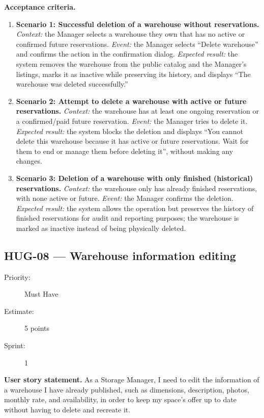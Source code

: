\documentclass[11pt,a4paper,oneside]{report}
\begin{document}
\textbf{Acceptance criteria.}
\begin{enumerate}
\item \textbf{Scenario 1: Successful deletion of a warehouse without reservations.} \emph{Context:} the Manager selects a warehouse they own that has no active or confirmed future reservations. \emph{Event:} the Manager selects ``Delete warehouse'' and confirms the action in the confirmation dialog. \emph{Expected result:} the system removes the warehouse from the public catalog and the Manager's listings, marks it as inactive while preserving its history, and displays ``The warehouse was deleted successfully.''
\item \textbf{Scenario 2: Attempt to delete a warehouse with active or future reservations.} \emph{Context:} the warehouse has at least one ongoing reservation or a confirmed/paid future reservation. \emph{Event:} the Manager tries to delete it. \emph{Expected result:} the system blocks the deletion and displays ``You cannot delete this warehouse because it has active or future reservations. Wait for them to end or manage them before deleting it'', without making any changes.
\item \textbf{Scenario 3: Deletion of a warehouse with only finished (historical) reservations.} \emph{Context:} the warehouse only has already finished reservations, with none active or future. \emph{Event:} the Manager confirms the deletion. \emph{Expected result:} the system allows the operation but preserves the history of finished reservations for audit and reporting purposes; the warehouse is marked as inactive instead of being physically deleted.
\end{enumerate}

\subsection{HUG-08 --- Warehouse information editing}
\label{req:HUG-08}
\begin{description}
\item[Priority:] Must Have \quad \item[Estimate:] 5 points \quad \item[Sprint:] 1
\end{description}

\textbf{User story statement.} As a Storage Manager, I need to edit the information of a warehouse I have already published, such as dimensions, description, photos, monthly rate, and availability, in order to keep my space's offer up to date without having to delete and recreate it.
\end{document}
